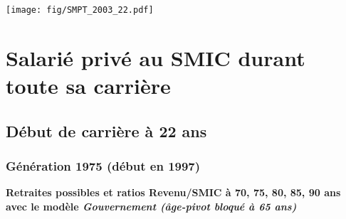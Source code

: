  \vspace{0.1cm} 

 \begin{center}\texttt{[image: fig/SMPT\_2003\_22.pdf]}\end{center} \label{fig/SMPT_2003_22.pdf} 

\newpage 
 
\chapter{Salarié privé au SMIC durant toute sa carrière} 


 \addto{\captionsenglish}{ \renewcommand{\mtctitle}{}} \setcounter{minitocdepth}{2} 
 \minitoc \newpage 

\section{Début de carrière à 22 ans} 

\subsection{Génération 1975 (début en 1997)} 

{\bf \noindent Retraites possibles et ratios Revenu/SMIC à 70, 75, 80, 85, 90 ans avec le modèle \emph{Gouvernement (âge-pivot bloqué à 65 ans)}}  
 
